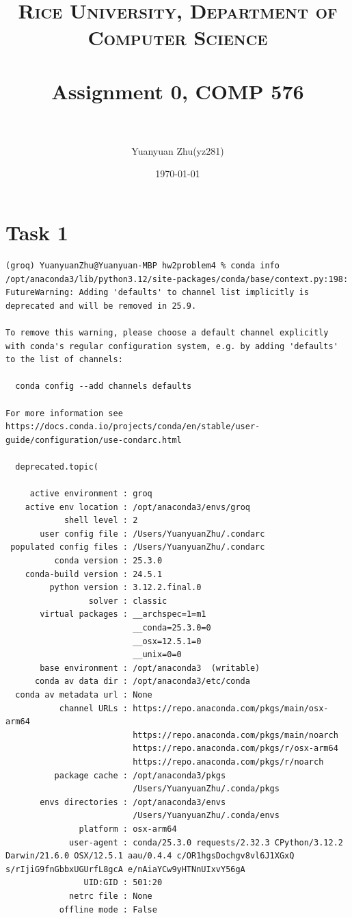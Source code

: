 \documentclass[paper=a4, fontsize=11pt]{scrartcl} %
\title{	
\normalfont \normalsize
\textsc{Rice University, Department of Computer Science} \\ [25pt] %
\horrule{0.5pt} \\[0.4cm] %
\huge Assignment 0, COMP 576 \\ %
\horrule{2pt} \\[0.5cm] %
}
\author{Yuanyuan Zhu(yz281)} %
\date{\normalsize\today} %
\numberwithin{equation}{section} %
\numberwithin{figure}{section} %
\numberwithin{table}{section} %
\begin{document}
\maketitle %


\section{Task 1}
\begin{verbatim}
(groq) YuanyuanZhu@Yuanyuan-MBP hw2problem4 % conda info
/opt/anaconda3/lib/python3.12/site-packages/conda/base/context.py:198: FutureWarning: Adding 'defaults' to channel list implicitly is deprecated and will be removed in 25.9. 

To remove this warning, please choose a default channel explicitly with conda's regular configuration system, e.g. by adding 'defaults' to the list of channels:

  conda config --add channels defaults

For more information see https://docs.conda.io/projects/conda/en/stable/user-guide/configuration/use-condarc.html

  deprecated.topic(

     active environment : groq
    active env location : /opt/anaconda3/envs/groq
            shell level : 2
       user config file : /Users/YuanyuanZhu/.condarc
 populated config files : /Users/YuanyuanZhu/.condarc
          conda version : 25.3.0
    conda-build version : 24.5.1
         python version : 3.12.2.final.0
                 solver : classic
       virtual packages : __archspec=1=m1
                          __conda=25.3.0=0
                          __osx=12.5.1=0
                          __unix=0=0
       base environment : /opt/anaconda3  (writable)
      conda av data dir : /opt/anaconda3/etc/conda
  conda av metadata url : None
           channel URLs : https://repo.anaconda.com/pkgs/main/osx-arm64
                          https://repo.anaconda.com/pkgs/main/noarch
                          https://repo.anaconda.com/pkgs/r/osx-arm64
                          https://repo.anaconda.com/pkgs/r/noarch
          package cache : /opt/anaconda3/pkgs
                          /Users/YuanyuanZhu/.conda/pkgs
       envs directories : /opt/anaconda3/envs
                          /Users/YuanyuanZhu/.conda/envs
               platform : osx-arm64
             user-agent : conda/25.3.0 requests/2.32.3 CPython/3.12.2 Darwin/21.6.0 OSX/12.5.1 aau/0.4.4 c/OR1hgsDochgv8vl6J1XGxQ s/rIjiG9fnGbbxUGUrfL8gcA e/nAiaYCw9yHTNnUIxvY56gA
                UID:GID : 501:20
             netrc file : None
           offline mode : False
\end{verbatim}
\end{document}
